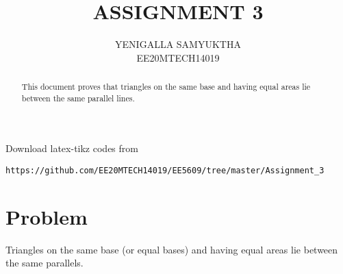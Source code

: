 \documentclass[journal,12pt,twocolumn]{IEEEtran}
\begin{document}
\makeatletter
{}
\makeatother
\let\StandardTheFigure\thefigure
\let\vec\mathbf
\renewcommand{\thefigure}{\theproblem}
\def\putbox#1#2#3{\makebox[0in][l]{\makebox[#1][l]{}\raisebox{\baselineskip}[0in][0in]{\raisebox{#2}[0in][0in]{#3}}}}
     \def\rightbox#1{\makebox[0in][r]{#1}}
     \def\centbox#1{\makebox[0in]{#1}}
     \def\topbox#1{\raisebox{-\baselineskip}[0in][0in]{#1}}
     \def\midbox#1{\raisebox{-0.5\baselineskip}[0in][0in]{#1}}
\vspace{3cm}
\title{ASSIGNMENT 3}
\author{YENIGALLA SAMYUKTHA\\EE20MTECH14019}
%
\maketitle
\newpage
\bigskip
\renewcommand{\thefigure}{\theenumi}
\renewcommand{\thetable}{\theenumi}
%
\begin{abstract}
This document proves that triangles on the same base and having equal areas lie between the same parallel lines.
\end{abstract}
Download latex-tikz codes from 
%
\begin{lstlisting}
https://github.com/EE20MTECH14019/EE5609/tree/master/Assignment_3
\end{lstlisting}
%
\section{Problem}
\item Triangles on the same base (or equal bases) and having equal areas lie between the same parallels.
\end{document}
